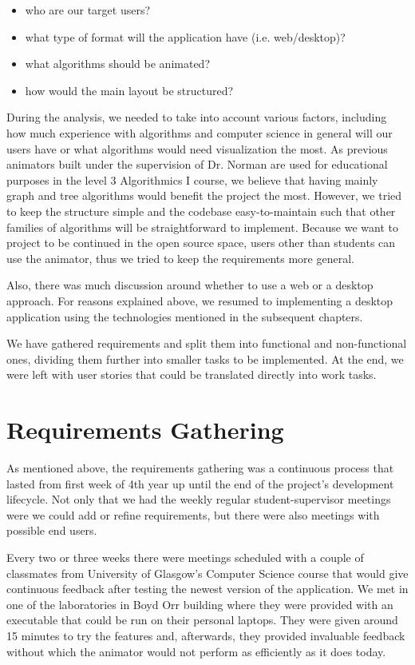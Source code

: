\documentclass{l4proj}
\begin{document}
\begin{itemize}
\item who are our target users?
\item what type of format will the application have (i.e. web/desktop)?
\item what algorithms should be animated?
\item how would the main layout be structured?
\end{itemize}

During the analysis, we needed to take into account various factors, including how much experience with algorithms and computer science in general will our users have or what algorithms would need visualization the most. As previous animators built under the supervision of Dr. Norman are used for educational purposes in the level 3 Algorithmics I course, we believe that having mainly graph and tree algorithms would benefit the project the most. However, we tried to keep the structure simple and the codebase easy-to-maintain such that other families of algorithms will be straightforward to implement. Because we want to project to be continued in the open source space, users other than students can use the animator, thus we tried to keep the requirements more general.

Also, there was much discussion around whether to use a web or a desktop approach. For reasons explained above, we resumed to implementing a desktop application using the technologies mentioned in the subsequent chapters.

We have gathered requirements and split them into functional and non-functional ones, dividing them further into smaller tasks to be implemented. At the end, we were left with user stories that could be translated directly into work tasks.

\section{Requirements Gathering}

As mentioned above, the requirements gathering was a continuous process that lasted from first week of 4th year up until the end of the project's development lifecycle. Not only that we had the weekly regular student-supervisor meetings were we could add or refine requirements, but there were also meetings with possible end users.

Every two or three weeks there were meetings scheduled with a couple of classmates from University of Glasgow's Computer Science course that would give continuous feedback after testing the newest version of the application. We met in one of the laboratories in Boyd Orr building where they were provided with an executable that could be run on their personal laptops. They were given around 15 minutes to try the features and, afterwards, they provided invaluable feedback without which the animator would not perform as efficiently as it does today.
\end{document}
